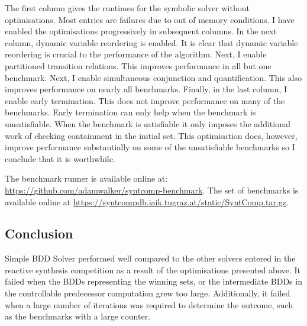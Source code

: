 The first column gives the runtimes for the symbolic solver without optimisations. Most entries are failures due to out of memory conditions. I have enabled the optimisations progressively in subsequent columns. In the next column, dynamic variable reordering is enabled. It is clear that dynamic variable reordering is crucial to the performance of the algorithm. Next, I enable partitioned transition relations. This improves performance in all but one benchmark. Next, I enable simultaneous conjunction and quantification. This also improves performance on nearly all benchmarks. Finally, in the last column, I enable early termination. This does not improve performance on many of the benchmarks. Early termination can only help when the benchmark is unsatisfiable. When the benchmark is satisfiable it only imposes the additional work of checking containment in the initial set. This optimisation does, however, improve performance substantially on some of the unsatisfiable benchmarks so I conclude that it is worthwhile.

The benchmark runner is available online at: \url{https://github.com/adamwalker/syntcomp-benchmark}. The set of benchmarks is available online at \url{https://syntcompdb.iaik.tugraz.at/static/SyntComp.tar.gz}.

\subsection{Conclusion}
Simple BDD Solver performed well compared to the other solvers entered in the reactive synthesis competition as a result of the optimisations presented above. It failed when the BDDs representing the winning sets, or the intermediate BDDs in the controllable predecessor computation grew too large. Additionally, it failed when a large number of iterations was required to determine the outcome, such as the benchmarks with a large counter. 

